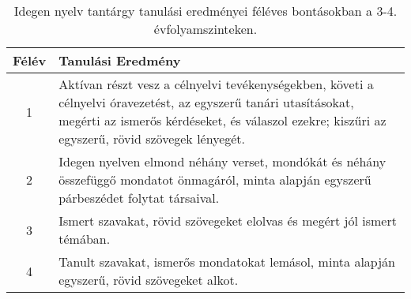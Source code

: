        
           \begin{longtable}{c | p{} }
            \caption[Idegen nyelv 3-4.]{Idegen nyelv tantárgy tanulási eredményei féléves bontásokban a 3-4. évfolyamszinteken. }  \\

            \textbf{Félév} & \textbf{Tanulási Eredmény} \\
            \hline
            \endhead
                                
                                          1 &  Aktívan részt vesz a célnyelvi tevékenységekben, követi a célnyelvi óravezetést, az egyszerű tanári utasításokat, megérti az ismerős kérdéseket, és válaszol ezekre; kiszűri az egyszerű, rövid szövegek lényegét. \\ \hline
                                          2 &  Idegen nyelven elmond néhány verset, mondókát és néhány összefüggő mondatot önmagáról, minta alapján egyszerű párbeszédet folytat társaival. \\ \hline
                                          3 &  Ismert szavakat, rövid szövegeket elolvas és megért jól ismert témában. \\ \hline
                                          4 &  Tanult szavakat, ismerős mondatokat lemásol, minta alapján egyszerű, rövid szövegeket alkot. \\ \hline
                                      
                        \end{longtable}
            \clearpage

